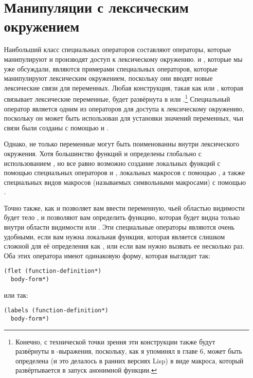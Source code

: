 \section{Манипуляции с лексическим окружением}

Наибольший класс специальных операторов составляют операторы, которые манипулируют и
производят доступ к лексическому окружению.  и , которые мы уже
обсуждали, являются примерами специальных операторов, которые манипулируют лексическим
окружением, поскольку они вводят новые лексические связи для переменных.  Любая
конструкция, такая как  или , которая связывает лексические
переменные, будет развёрнута в  или .\footnote{Конечно, с технической
  точки зрения эти конструкции также будут развёрнуты в -выражения,
  поскольку, как я упоминял в главе 6,  может быть определена (и это делалось в
  ранних версиях Lisp) в виде макроса, который развёртывается в запуск анонимной функции.}
Специальный оператор  является одним из операторов для доступа к лексическому
окружению, поскольку он может быть использован для установки значений переменных, чьи
связи были созданы с помощью  и .

Однако, не только переменные могут быть поименованны внутри лексического окружения.  Хотя
большинство функций и определены глобально с использованием , но все равно
возможно создание локальных функций с помощью специальных операторов  и
, локальных макросов с помощью , а также специальных видов
макросов (называемых символьными макросами) с помощью .

Точно также, как и  позволяет вам ввести переменную, чьей областью видимости
будет тело ,  и  позволяют вам определить функцию,
которая будет видна только внутри области видимости  или .  Эти
специальные операторы являются очень удобными, если вам нужна локальная функция, которая
является слишком сложной для её определения как , или если вам нужно вызвать
ее несколько раз.  Оба этих оператора имеют одинаковую форму, которая выглядит так:

\begin{lstlisting}
(flet (function-definition*)
  body-form*)
\end{lstlisting}

или так:

\begin{lstlisting}
(labels (function-definition*)
  body-form*)
\end{lstlisting}

